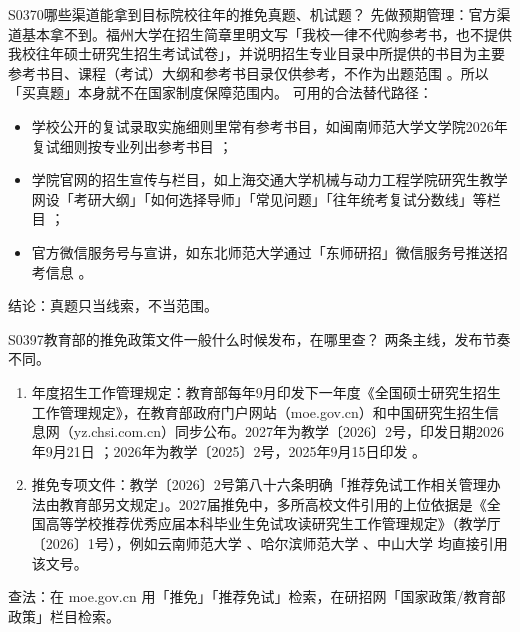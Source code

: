\begin{qa}{S0370}{哪些渠道能拿到目标院校往年的推免真题、机试题？}
先做预期管理：官方渠道基本拿不到。福州大学在招生简章里明文写「我校一律不代购参考书，也不提供我校往年硕士研究生招生考试试卷」，并说明招生专业目录中所提供的书目为主要参考书目、课程（考试）大纲和参考书目录仅供参考，不作为出题范围 。所以「买真题」本身就不在国家制度保障范围内。
可用的合法替代路径：
\begin{itemize}
  \item 学校公开的复试录取实施细则里常有参考书目，如闽南师范大学文学院2026年复试细则按专业列出参考书目 ；
  \item 学院官网的招生宣传与栏目，如上海交通大学机械与动力工程学院研究生教学网设「考研大纲」「如何选择导师」「常见问题」「往年统考复试分数线」等栏目 ；
  \item 官方微信服务号与宣讲，如东北师范大学通过「东师研招」微信服务号推送招考信息 。
\end{itemize}
结论：真题只当线索，不当范围。
\end{qa}

\begin{qa}{S0397}{教育部的推免政策文件一般什么时候发布，在哪里查？}
两条主线，发布节奏不同。
\begin{enumerate}
  \item 年度招生工作管理规定：教育部每年9月印发下一年度《全国硕士研究生招生工作管理规定》，在教育部政府门户网站（moe.gov.cn）和中国研究生招生信息网（yz.chsi.com.cn）同步公布。2027年为教学〔2026〕2号，印发日期2026年9月21日 ；2026年为教学〔2025〕2号，2025年9月15日印发 。
  \item 推免专项文件：教学〔2026〕2号第八十六条明确「推荐免试工作相关管理办法由教育部另文规定」。2027届推免中，多所高校文件引用的上位依据是《全国高等学校推荐优秀应届本科毕业生免试攻读研究生工作管理规定》（教学厅〔2026〕1号），例如云南师范大学 、哈尔滨师范大学 、中山大学  均直接引用该文号。
\end{enumerate}
查法：在 moe.gov.cn 用「推免」「推荐免试」检索，在研招网「国家政策/教育部政策」栏目检索。
\end{qa}

